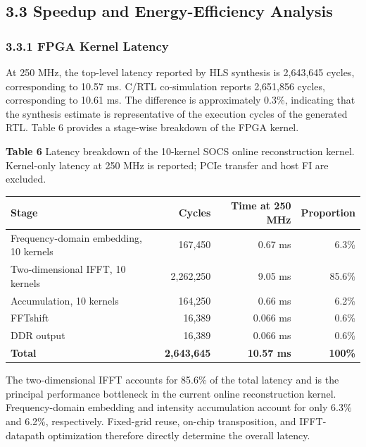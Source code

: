 \documentclass[
  preprint]{elsarticle}
\newcounter{none} %
\begin{document}
\subsection{3.3 Speedup and Energy-Efficiency
Analysis}\label{speedup-and-energy-efficiency-analysis}

\subsubsection{3.3.1 FPGA Kernel Latency}\label{fpga-kernel-latency}

At 250 MHz, the top-level latency reported by HLS synthesis is 2,643,645
cycles, corresponding to 10.57 ms. C/RTL co-simulation reports 2,651,856
cycles, corresponding to 10.61 ms. The difference is approximately
0.3\%, indicating that the synthesis estimate is representative of the
execution cycles of the generated RTL. Table 6 provides a stage-wise
breakdown of the FPGA kernel.

\textbf{Table 6} Latency breakdown of the 10-kernel SOCS online
reconstruction kernel. Kernel-only latency at 250 MHz is reported; PCIe
transfer and host FI are excluded.

{\def\LTcaptype{none} %
\begin{longtable}[]{@{}lrrr@{}}
\toprule\noalign{}
Stage & Cycles & Time at 250 MHz & Proportion \\
\midrule\noalign{}
\endhead
\bottomrule\noalign{}
\endlastfoot
Frequency-domain embedding, 10 kernels & 167,450 & 0.67 ms & 6.3\% \\
Two-dimensional IFFT, 10 kernels & 2,262,250 & 9.05 ms & 85.6\% \\
Accumulation, 10 kernels & 164,250 & 0.66 ms & 6.2\% \\
FFTshift & 16,389 & 0.066 ms & 0.6\% \\
DDR output & 16,389 & 0.066 ms & 0.6\% \\
\textbf{Total} & \textbf{2,643,645} & \textbf{10.57 ms} &
\textbf{100\%} \\
\end{longtable}
}

The two-dimensional IFFT accounts for 85.6\% of the total latency and is
the principal performance bottleneck in the current online
reconstruction kernel. Frequency-domain embedding and intensity
accumulation account for only 6.3\% and 6.2\%, respectively. Fixed-grid
reuse, on-chip transposition, and IFFT-datapath optimization therefore
directly determine the overall latency.
\end{document}
